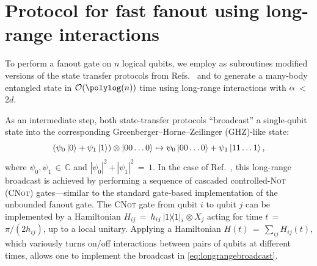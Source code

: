 \section{Protocol for fast fanout using long-range interactions}
To perform a fanout gate on $n$ logical qubits, we
employ as subroutines modified versions of the state transfer protocols from Refs.~\cite{Eldredge2017} and \cite{Tran2021a} to generate a many-body entangled state in $\O{\polylog(n)}$ time using long-range interactions with $\alpha$\,$<$\,$2d$.

As an intermediate step, both state-transfer protocols ``broadcast'' a single-qubit state into the corresponding Greenberger–Horne–Zeilinger (GHZ)-like state:
\begin{equation}
    \label{eq:longrangebroadcast}
	(\psi_0 \left | 0 \right\rangle + \psi_1 \left | 1 \right\rangle)\otimes \left | 0 0 \dots 0 \right\rangle \mapsto \psi_0 \left | 0 0  \dots 0 \right\rangle + \psi_1 \left | 1 1 \dots 1 \right\rangle,
\end{equation}
where $\psi_0, \psi_1$\,$\in$\,$\mathbb{C}$ and $|\psi_0|^2$\,$+$\,$|\psi_1|^2$\,$=$\,$1$.
In the case of Ref.~\cite{Eldredge2017}, this long-range broadcast is achieved by performing a sequence of cascaded controlled-\textsc{Not} (\textsc{CNot}) gates---similar to the standard gate-based implementation of the unbounded fanout gate.
The \textsc{CNot} gate from qubit $i$ to qubit $j$ can be implemented by a Hamiltonian $H_{ij}$\,$=$\,$h_{ij} \ketbra{1}_i$\,$\otimes$\,$X_j$ acting for time $t$\,$=$\,$\pi/(2h_{ij})$, up to a local unitary.
Applying a Hamiltonian $H(t)$\,$=$\,$\sum_{ij} H_{ij}(t)$, which variously turns on/off interactions between pairs of qubits at different times, allows one to implement the broadcast in \cref{eq:longrangebroadcast}.

